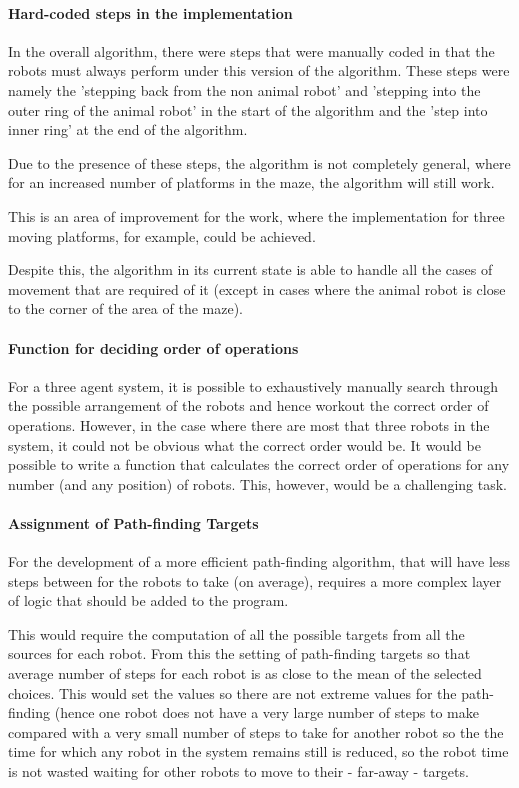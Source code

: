 \paragraph{Hard-coded steps in the implementation} In the overall algorithm, there were steps that were manually coded in that the robots must always perform under this version of the algorithm. These steps were namely the 'stepping back from the non animal robot' and 'stepping into the outer ring of the animal robot' in the start of the algorithm and the 'step into inner ring' at the end of the algorithm.

Due to the presence of these steps, the algorithm is not completely general, where for an increased number of platforms in the maze, the algorithm will still work. 

This is an area of improvement for the work, where the implementation for three moving platforms, for example, could be achieved.

Despite this, the algorithm in its current state is able to handle all the cases of movement that are required of it (except in cases where the animal robot is close to the corner of the area of the maze).

\paragraph{Function for deciding order of operations}

For a three agent system, it is possible to exhaustively manually search through the possible arrangement of the robots and hence workout the correct order of operations. However, in the case where there are most that three robots in the system, it could not be obvious what the correct order would be. It would be possible to write a function that calculates the correct order of operations for any number (and any position) of robots. This, however, would be a challenging task.

\paragraph{Assignment of Path-finding Targets}

For the development of a more efficient path-finding algorithm, that will have less steps between for the robots to take (on average), requires a more complex layer of logic that should be added to the program.

This would require the computation of all the possible targets from all the sources for each robot. From this the setting of path-finding targets so that average number of steps for each robot is as close to the mean of the selected choices. This would set the values so there are not extreme values for the path-finding (hence one robot does not have a very large number of steps to make compared with a very small number of steps to take for another robot so the the time for which any robot in the system remains still is reduced, so the robot time is not wasted waiting for other robots to move to their - far-away - targets.





